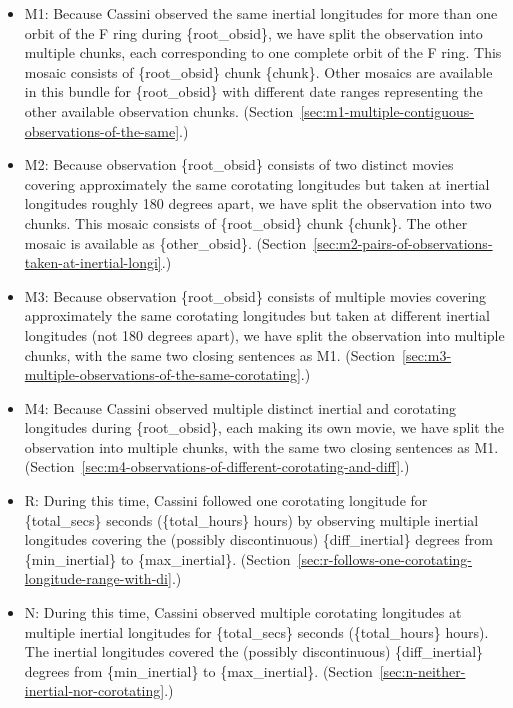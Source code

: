 \begin{itemize}
\item M1: Because Cassini observed the same inertial longitudes for more than one orbit of the F ring during \{root\_\allowbreak{}obsid\}, we have split the observation into multiple chunks, each corresponding to one complete orbit of the F ring. This mosaic consists of \{root\_\allowbreak{}obsid\} chunk \{chunk\}. Other mosaics are available in this bundle for \{root\_\allowbreak{}obsid\} with different date ranges representing the other available observation chunks. (Section~\ref{sec:m1-multiple-contiguous-observations-of-the-same}.)
\item M2: Because observation \{root\_\allowbreak{}obsid\} consists of two distinct \textquotedbl movies\textquotedbl{} covering approximately the same corotating longitudes but taken at inertial longitudes roughly 180 degrees apart, we have split the observation into two chunks. This mosaic consists of \{root\_\allowbreak{}obsid\} chunk \{chunk\}. The other mosaic is available as \{other\_\allowbreak{}obsid\}. (Section~\ref{sec:m2-pairs-of-observations-taken-at-inertial-longi}.)
\item M3: Because observation \{root\_\allowbreak{}obsid\} consists of multiple \textquotedbl movies\textquotedbl{} covering approximately the same corotating longitudes but taken at different inertial longitudes (not 180 degrees apart), we have split the observation into multiple chunks, with the same two closing sentences as M1. (Section~\ref{sec:m3-multiple-observations-of-the-same-corotating}.)
\item M4: Because Cassini observed multiple distinct inertial and corotating longitudes during \{root\_\allowbreak{}obsid\}, each making its own \textquotedbl movie\textquotedbl{}, we have split the observation into multiple chunks, with the same two closing sentences as M1. (Section~\ref{sec:m4-observations-of-different-corotating-and-diff}.)
\item R: During this time, Cassini followed one corotating longitude for \{total\_\allowbreak{}secs\} seconds (\{total\_\allowbreak{}hours\} hours) by observing multiple inertial longitudes covering the (possibly discontinuous) \{diff\_\allowbreak{}inertial\} degrees from \{min\_\allowbreak{}inertial\} to \{max\_\allowbreak{}inertial\}. (Section~\ref{sec:r-follows-one-corotating-longitude-range-with-di}.)
\item N: During this time, Cassini observed multiple corotating longitudes at multiple inertial longitudes for \{total\_secs\} seconds (\{total\_hours\} hours). The inertial longitudes covered the (possibly discontinuous) \{diff\_inertial\} degrees from \{min\_inertial\} to \{max\_inertial\}. (Section~\ref{sec:n-neither-inertial-nor-corotating}.)

\end{itemize}
